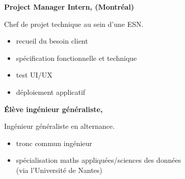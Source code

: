 \documentclass{cv}
\begin{document}
\begin{minipage}[t]{.65\textwidth}
\begin{expbox}[title={déc. 2016, \faicon{clock-o} 3 ans}]
\end{expbox}

\begin{expbox}[title={mai 2018, \faicon{clock-o} 4 mois}]

	\begin{minipage}[t]{\logoboxwidth}
	\centering
	\end{minipage}
	\begin{minipage}[t]{0.8\textwidth}
	\textbf{Project Manager Intern, \adfab{} (Montréal)} 

	Chef de projet technique au sein d'une ESN.

	\begin{itemize}
	\item recueil du besoin client
	\item spécification fonctionnelle et technique
	\item test UI/UX
	\item déploiement applicatif
	\end{itemize}
	\end{minipage}

\end{expbox}

\begin{expbox}[title={2016 -- 2019}]

	\begin{minipage}[t]{\logoboxwidth}
	\centering
	\end{minipage}
	\begin{minipage}[t]{0.8\textwidth}
	\textbf{Élève ingénieur généraliste, \ecn{}} 

	Ingénieur généraliste en alternance.

	\begin{itemize}
	\item tronc commun ingénieur
	\item spécialisation maths appliquées/sciences des données\\ (via l'Université de Nantes)
	\end{itemize}
	\end{minipage}

\end{expbox}
\end{minipage}
\hfill
\end{document}
